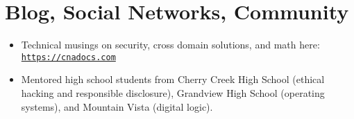 \section*{Blog, Social Networks, Community}
\vspace{-2mm}

\begin{itemize}
    \item Technical musings on security, cross domain solutions, and math
        here: \href{https://cnadocs.com}{\nolinkurl{https://cnadocs.com}}
    \item Mentored high school students from Cherry Creek High School
        (ethical hacking and responsible disclosure), Grandview High School
        (operating systems), and Mountain Vista (digital logic).
\end{itemize}

